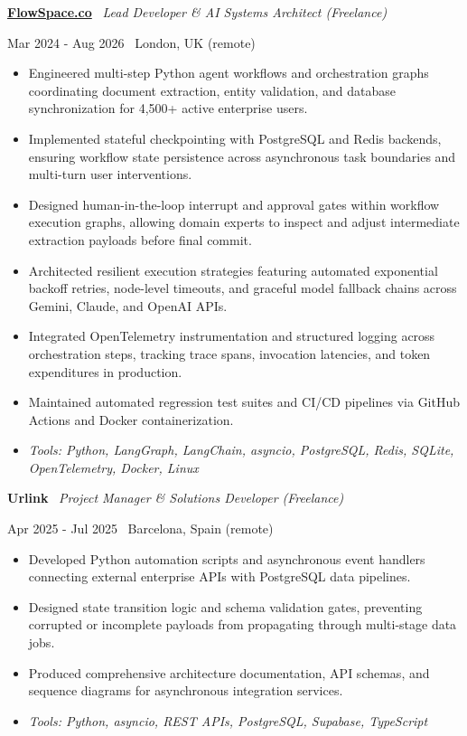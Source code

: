 \documentclass[a4paper,10pt]{article}
\newcommand{\role}[4]{%
 \vspace{2pt}\noindent
 \begin{minipage}[t]{0.70\textwidth}\raggedright\textbf{#1} \textbullet\ \textit{#3}\end{minipage}%
 \hfill
 \begin{minipage}[t]{0.28\textwidth}\raggedleft\footnotesize\color{gray}#2 \textbullet\ #4\end{minipage}%
 \vspace{1pt}%
}
\begin{document}
\role{\href{https://flowspace.co}{FlowSpace.co}}{Mar 2024 - Aug 2026}{Lead Developer \& AI Systems Architect (Freelance)}{London, UK (remote)}
\begin{itemize}
 \item Engineered multi-step Python agent workflows and orchestration graphs coordinating document extraction, entity validation, and database synchronization for 4,500+ active enterprise users.
 \item Implemented stateful checkpointing with PostgreSQL and Redis backends, ensuring workflow state persistence across asynchronous task boundaries and multi-turn user interventions.
 \item Designed human-in-the-loop interrupt and approval gates within workflow execution graphs, allowing domain experts to inspect and adjust intermediate extraction payloads before final commit.
 \item Architected resilient execution strategies featuring automated exponential backoff retries, node-level timeouts, and graceful model fallback chains across Gemini, Claude, and OpenAI APIs.
 \item Integrated OpenTelemetry instrumentation and structured logging across orchestration steps, tracking trace spans, invocation latencies, and token expenditures in production.
 \item Maintained automated regression test suites and CI/CD pipelines via GitHub Actions and Docker containerization.
 \item \textit{Tools: Python, LangGraph, LangChain, asyncio, PostgreSQL, Redis, SQLite, OpenTelemetry, Docker, Linux}
\end{itemize}

\role{Urlink}{Apr 2025 - Jul 2025}{Project Manager \& Solutions Developer (Freelance)}{Barcelona, Spain (remote)}
\begin{itemize}
 \item Developed Python automation scripts and asynchronous event handlers connecting external enterprise APIs with PostgreSQL data pipelines.
 \item Designed state transition logic and schema validation gates, preventing corrupted or incomplete payloads from propagating through multi-stage data jobs.
 \item Produced comprehensive architecture documentation, API schemas, and sequence diagrams for asynchronous integration services.
 \item \textit{Tools: Python, asyncio, REST APIs, PostgreSQL, Supabase, TypeScript}
\end{itemize}
\end{document}
